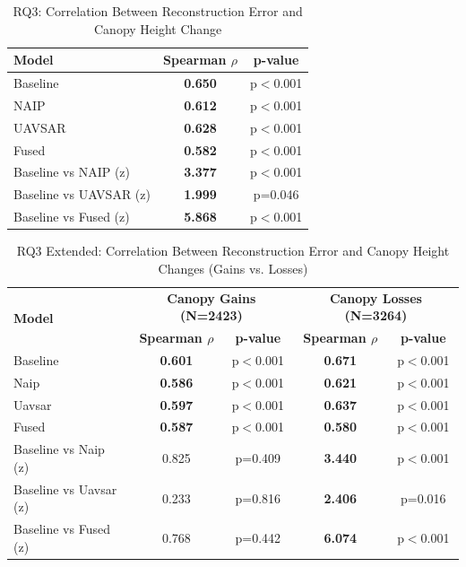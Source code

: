 \documentclass[remotesensing,article,submit,pdftex,moreauthors]{Definitions/mdpi}
\begin{document}
\begin{table}[htbp]
\centering
\caption{RQ3: Correlation Between Reconstruction Error and Canopy Height Change}
\begin{tabular}{lcc}
\toprule
\textbf{Model} & \textbf{Spearman $\rho$} & \textbf{p-value} \\
\midrule
Baseline & \textbf{0.650} & p$<$0.001 \\
NAIP & \textbf{0.612} & p$<$0.001 \\
UAVSAR & \textbf{0.628} & p$<$0.001 \\
Fused & \textbf{0.582} & p$<$0.001 \\
\midrule
Baseline vs NAIP (z) & \textbf{3.377} & p$<$0.001 \\
Baseline vs UAVSAR (z) & \textbf{1.999} & p=0.046 \\
Baseline vs Fused (z) & \textbf{5.868} & p$<$0.001 \\
\bottomrule
\end{tabular}
\label{tab:rq3_results}
\end{table}


\begin{table}[htbp]
\centering
\caption{RQ3 Extended: Correlation Between Reconstruction Error and Canopy Height Changes (Gains vs. Losses)}
\begin{tabular}{lcccc}
\toprule
\multirow{2}{*}{\textbf{Model}} & \multicolumn{2}{c}{\textbf{Canopy Gains (N=2423)}} & \multicolumn{2}{c}{\textbf{Canopy Losses (N=3264)}} \\
\cmidrule(lr){2-3} \cmidrule(lr){4-5}
 & \textbf{Spearman $\rho$} & \textbf{p-value} & \textbf{Spearman $\rho$} & \textbf{p-value} \\
\midrule
Baseline & \textbf{0.601} & p$<$0.001 & \textbf{0.671} & p$<$0.001 \\
Naip & \textbf{0.586} & p$<$0.001 & \textbf{0.621} & p$<$0.001 \\
Uavsar & \textbf{0.597} & p$<$0.001 & \textbf{0.637} & p$<$0.001 \\
Fused & \textbf{0.587} & p$<$0.001 & \textbf{0.580} & p$<$0.001 \\
\midrule
Baseline vs Naip (z) & 0.825 & p=0.409 & \textbf{3.440} & p$<$0.001 \\
Baseline vs Uavsar (z) & 0.233 & p=0.816 & \textbf{2.406} & p=0.016 \\
Baseline vs Fused (z) & 0.768 & p=0.442 & \textbf{6.074} & p$<$0.001 \\
\bottomrule
\end{tabular}
\label{tab:rq3_extended_results}
\end{table}
\end{document}
